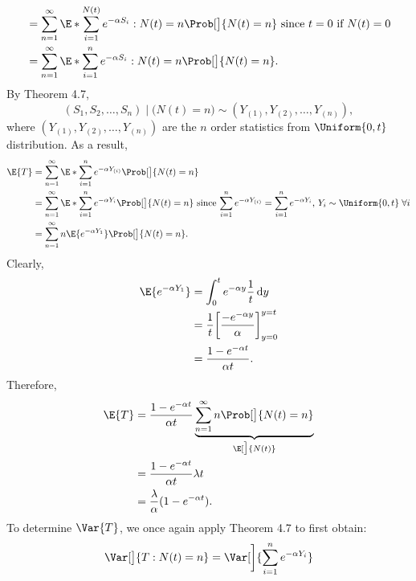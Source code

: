 \begin{Example}
\begin{align*}
             & =\sum_{n=1}^{\infty}\E*{\sum_{i=1}^{N(t)}e^{-\alpha S_i}\given N(t)=n}\Prob[\big]{N(t)=n} \text{ since $t=0$ if $N(t)=0$} \\
             & =\sum_{n=1}^{\infty}\E*{\sum_{i=1}^{n}e^{-\alpha S_i}\given N(t)=n}\Prob[\big]{N(t)=n}.
        \end{align*}
        By Theorem 4.7,
        \[ (S_1,S_2,\ldots,S_n)\mid\bigl(N(t)=n\bigr) \sim (Y_{(1)},Y_{(2)},\ldots,Y_{(n)}), \]
        where $ (Y_{(1)},Y_{(2)},\ldots,Y_{(n)}) $ are the $ n $ order statistics from
    $ \Uniform{0,t} $ distribution. As a result,
        \begin{align*}
            \E{T}
             & =\sum_{n=1}^{\infty}\E*{\sum_{i=1}^{n}e^{-\alpha Y_{(i)}}}\Prob[\big]{N(t)=n}                                                                                                                         \\
             & =\sum_{n=1}^{\infty}\E*{\sum_{i=1}^{n}e^{-\alpha Y_{i}}}\Prob[\big]{N(t)=n}\text{ since $ \sum_{i=1}^{n}e^{-\alpha Y_{(i)}}=\sum_{i=1}^{n}e^{-\alpha Y_{i}} $, $ Y_i \sim \Uniform{0,t}\;\forall i $} \\
             & =\sum_{n=1}^{\infty}n\E{e^{-\alpha Y_1}}\Prob[\big]{N(t)=n}.
        \end{align*}
        Clearly,
        \begin{align*}
            \E{e^{-\alpha Y_1}}
             & =\int_{0}^{t}e^{-\alpha y}\frac{1}{t}\odif{y}                       \\
             & =\frac{1}{t}\biggl[\frac{-e^{-\alpha y}}{\alpha}\biggr]_{y=0}^{y=t} \\
             & =\frac{1-e^{-\alpha t}}{\alpha t}.
        \end{align*}
        Therefore,
        \begin{align*}
            \E{T}
             & =\frac{1-e^{-\alpha t}}{\alpha t}\underbrace{\sum_{n=1}^{\infty} n\Prob[\big]{N(t)=n}}_{\E[\big]{N(t)}} \\
             & =\frac{1-e^{-\alpha t}}{\alpha t}\lambda t                                                              \\
             & =\frac{\lambda}{\alpha}(1-e^{-\alpha t}).
        \end{align*}
        To determine $ \Var{T} $, we once again apply Theorem 4.7 to first obtain:
        \begin{align*}
            \Var[\big]{T\given N(t)=n}
             & =\Var[\bigg]{\sum_{i=1}^{n}e^{-\alpha Y_{i}}}                                                                            \\

\end{align*}
\end{Example}
